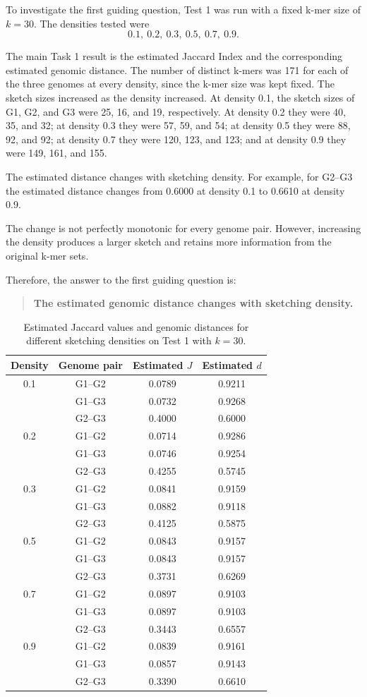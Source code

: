 \documentclass[11pt,a4paper]{article}
\begin{document}
To investigate the first guiding question, Test 1 was run with a fixed
k-mer size of $k=30$. The densities tested were
\[
0.1,\ 0.2,\ 0.3,\ 0.5,\ 0.7,\ 0.9.
\]

The main Task 1 result is the estimated Jaccard Index and the corresponding
estimated genomic distance.
The number of distinct k-mers was 171 for each of the three genomes at
every density, since the k-mer size was kept fixed. The sketch sizes
increased as the density increased. At density 0.1, the sketch sizes of
G1, G2, and G3 were 25, 16, and 19, respectively. At density 0.2 they
were 40, 35, and 32; at density 0.3 they were 57, 59, and 54; at density
0.5 they were 88, 92, and 92; at density 0.7 they were 120, 123, and
123; and at density 0.9 they were 149, 161, and 155.

The estimated distance changes with sketching density. For example, for
G2--G3 the estimated distance changes from 0.6000 at density 0.1 to
0.6610 at density 0.9.

The change is not perfectly monotonic for every genome pair. However,
increasing the density produces a larger sketch and retains more
information from the original k-mer sets.

Therefore, the answer to the first guiding question is:
\begin{quote}
\textbf{The estimated genomic distance changes with sketching density.}
\end{quote}
\begin{table}[H]
\centering
\small
\caption{Estimated Jaccard values and genomic distances for different
sketching densities on Test 1 with $k=30$.}
\begin{tabular}{c|c|c|c}
\toprule
Density & Genome pair & Estimated $J$ & Estimated $d$\\
\midrule
0.1 & G1--G2 & 0.0789 & 0.9211\\
    & G1--G3 & 0.0732 & 0.9268\\
    & G2--G3 & 0.4000 & 0.6000\\
\midrule
0.2 & G1--G2 & 0.0714 & 0.9286\\
    & G1--G3 & 0.0746 & 0.9254\\
    & G2--G3 & 0.4255 & 0.5745\\
\midrule
0.3 & G1--G2 & 0.0841 & 0.9159\\
    & G1--G3 & 0.0882 & 0.9118\\
    & G2--G3 & 0.4125 & 0.5875\\
\midrule
0.5 & G1--G2 & 0.0843 & 0.9157\\
    & G1--G3 & 0.0843 & 0.9157\\
    & G2--G3 & 0.3731 & 0.6269\\
\midrule
0.7 & G1--G2 & 0.0897 & 0.9103\\
    & G1--G3 & 0.0897 & 0.9103\\
    & G2--G3 & 0.3443 & 0.6557\\
\midrule
0.9 & G1--G2 & 0.0839 & 0.9161\\
    & G1--G3 & 0.0857 & 0.9143\\
    & G2--G3 & 0.3390 & 0.6610\\
\bottomrule
\end{tabular}
\end{table}
\end{document}
